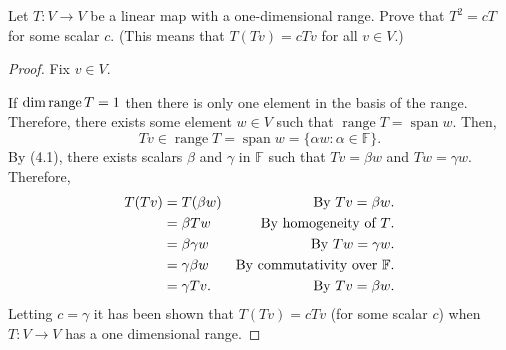 Let $T : V \to V$ be a linear map with a one-dimensional range.  Prove that $T^2 = cT$ for some scalar $c$.  (This means that $T(Tv) = cTv$ for all $v \in V$.)\vspace{0.5in}
\begin{mybox}
\begin{proof}
    Fix $v \in V$.
    
    \nl If $\operatorname{dim}\operatorname{range}{T} = 1$ then there is only one element in the basis of the range. Therefore, there exists some element $w \in V$ such that $\operatorname{range}T = \operatorname{span}w$. Then,
    \[Tv \in \operatorname{range}T = \operatorname{span}w = \{\alpha w : \alpha \in \mathbb{F}\}.\tag{4.1}\]
    By (4.1), there exists scalars $\beta$ and $\gamma$ in $\mathbb{F}$ such that $Tv = \beta w$ and $Tw = \gamma w$. Therefore,
    \begin{align}
        T(Tv) &= T(\beta w) & \text{By }Tv = \beta w\text{.}\notag\\
        &= \beta Tw & \text{By homogeneity of }T\text{.}\notag\\
        &= \beta \gamma w & \text{By }Tw = \gamma w\text{.}\notag\\
        &= \gamma \beta w & \text{By commutativity over }\mathbb{F}\text{.}\notag\\
        &= \gamma Tv. & \text{By }Tv = \beta w\text{.}\notag
    \end{align}
    Letting $c = \gamma$ it has been shown that $T(Tv) = cTv$ (for some scalar $c$) when $T : V \to V$ has a one dimensional range.
\end{proof}
\end{mybox}